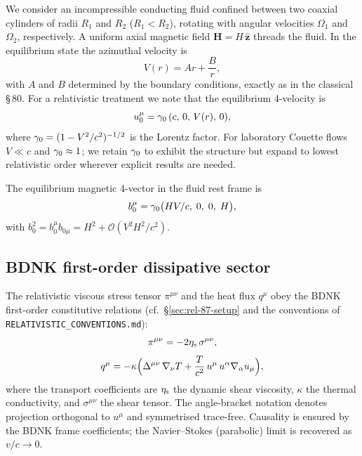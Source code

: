 We consider an incompressible conducting fluid confined between two
coaxial cylinders of radii $R_1$ and $R_2$ ($R_1<R_2$), rotating with
angular velocities $\Omega_1$ and $\Omega_2$, respectively.  A uniform
axial magnetic field $\mathbf{H} = H\,\hat{\mathbf{z}}$ threads the
fluid.  In the equilibrium state the azimuthal velocity is
\begin{equation}
  V(r) = Ar + \frac{B}{r},
  \label{eq:rel-9-AB}
\end{equation}
with $A$ and $B$ determined by the boundary conditions, exactly as in the
classical \S\,80.  For a relativistic treatment we note that the
equilibrium 4-velocity is
\begin{equation}
  u^{\mu}_0 = \gamma_0\,(c,\,0,\,V(r),\,0),
  \label{eq:rel-9-u0}
\end{equation}
where $\gamma_0 = (1 - V^2/c^2)^{-1/2}$ is the Lorentz factor.  For
laboratory Couette flows $V\ll c$ and $\gamma_0 \approx 1$; we retain
$\gamma_0$ to exhibit the structure but expand to lowest relativistic order
wherever explicit results are needed.

The equilibrium magnetic 4-vector in the fluid rest frame is
\begin{equation}
  b^{\mu}_0 = \gamma_0\bigl(HV/c,\;0,\;0,\;H\bigr),
  \label{eq:rel-9-b0}
\end{equation}
with $b^2_0 = b^{\mu}_0 b_{0\mu} = H^2 + \mathcal{O}(V^2H^2/c^2)$.

\subsection{BDNK first-order dissipative sector}
\label{sec:rel-87-IS}

The relativistic viscous stress tensor $\pi^{\mu\nu}$ and the heat flux
$q^{\mu}$ obey the BDNK first-order constitutive relations (cf.\
\S\ref{sec:rel-87-setup} and the conventions of
\texttt{RELATIVISTIC\_CONVENTIONS.md}):
\begin{equation}
  \pi^{\mu\nu}

  = -2\shearvisc\,\sigma^{\mu\nu},
  \label{eq:rel-9-IS-pi}
\end{equation}
\begin{equation}
  q^{\mu}
  = -\kappa\Bigl(\Delta^{\mu\nu}\,\nabla_{\nu}T
      + \frac{T}{c^2}\,u^{\mu}\,u^{\alpha}\nabla_{\alpha}u_{\mu}\Bigr),
  \label{eq:rel-9-IS-q}
\end{equation}
where the transport coefficients are
$\eta_{\mathrm{s}}$ the dynamic shear viscosity, $\kappa$ the thermal
conductivity, and $\sigma^{\mu\nu}$ the shear tensor.  The angle-bracket
notation denotes projection orthogonal to $u^{\mu}$ and symmetrised
trace-free.  Causality is ensured by the BDNK frame coefficients; the
Navier--Stokes (parabolic) limit is recovered as $v/c \to 0$.

